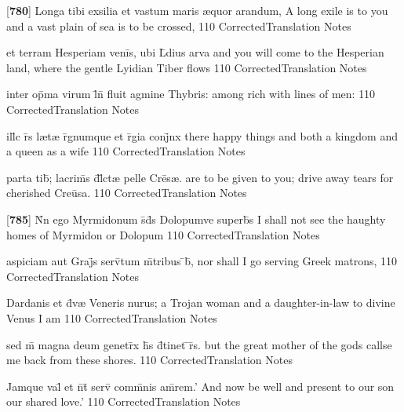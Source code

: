 \latline
  {[\textbf{780}] Longa tibi exsilia et vastum maris {\ae}quor arandum,}
  { A long exile is to you and a vast plain of sea is to be crossed, }
  {110}
  { CorrectedTranslation }
  { Notes }


\latline
  {et terram Hesperiam veni\={}s, ubi L\={}dius arva}
  { and you will come to the Hesperian land, where the gentle Lyidian Tiber flows }
  {110}
  { CorrectedTranslation }
  { Notes }


\latline
  {inter op\={\macron {\i}}ma virum l\={}n\={\macron {\i}} fluit agmine Thybris:}
  { among rich with lines of men:  }
  {110}
  { CorrectedTranslation }
  { Notes }


\latline
  {ill\={\macron {\i}}c r\={}s l{\ae}t{\ae} r\={}gnumque et r\={}gia conj\={}nx}
  { there happy things and both a kingdom and a queen as a wife }
  {110}
  { CorrectedTranslation }
  { Notes }


\latline
  {parta tib\={\macron {\i}}; lacrim\={}s d\={\macron {\i}}l\={}ct{\ae} pelle Cre\={}s{\ae}.}
  { are to be given to you; drive away tears for cherished Cre\={u}sa. }
  {110}
  { CorrectedTranslation }
  { Notes }


\latline
  {[\textbf{785}] N\={}n ego Myrmidonum s\={}d\={}s Dolopumve superb\={}s}
  { I shall not see the haughty homes of Myrmidon or Dolopum  }
  {110}
  { CorrectedTranslation }
  { Notes }


\latline
  {aspiciam aut Graj\={\macron {\i}}s serv\={\macron {\i}}tum m\={}tribus \={\macron {\i}}b\={},}
  { nor shall I go serving Greek matrons, }
  {110}
  { CorrectedTranslation }
  { Notes }


\latline
  {Dardanis et d\={\macron {\i}}v{\ae} Veneris nurus;}
  { a Trojan woman and a daughter-in-law to divine Venus I am }
  {110}
  { CorrectedTranslation }
  { Notes }


\latline
  {sed m\={} magna deum genetr\={\macron {\i}}x h\={\macron {\i}}s d\={}tinet \={}r\={\macron {\i}}s.}
  { but the great mother of the gods callse me back from these shores.   }
  {110}
  { CorrectedTranslation }
  { Notes }


\latline
  {Jamque val\={} et n\={}t\={\macron {\i}} serv\={} comm\={}nis am\={}rem.'}
  { And now be well and present to our son our shared love.' }
  {110}
  { CorrectedTranslation }
  { Notes }


